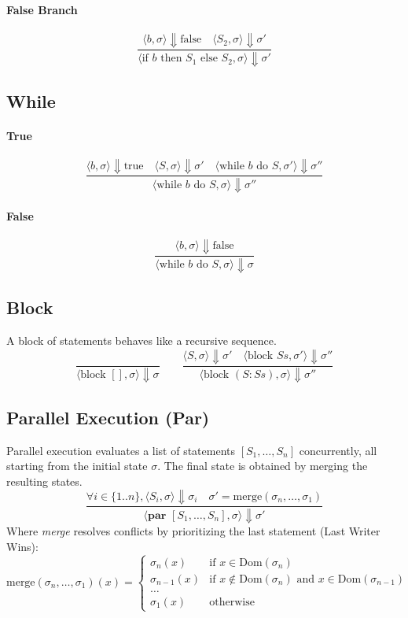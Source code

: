 \documentclass{article}
\begin{document}
	\paragraph{False Branch}
	\[
	\frac{\langle b, \sigma \rangle \Downarrow \text{false} \quad \langle S_2, \sigma \rangle \Downarrow \sigma'}{\langle \text{if } b \text{ then } S_1 \text{ else } S_2, \sigma \rangle \Downarrow \sigma'}
	\]
	
	\subsection{While}
	\paragraph{True}
	\[
	\frac{\langle b, \sigma \rangle \Downarrow \text{true} \quad \langle S, \sigma \rangle \Downarrow \sigma' \quad \langle \text{while }b \text{ do } S, \sigma' \rangle \Downarrow \sigma''}
	{\langle \text{while } b \text{ do } S, \sigma \rangle \Downarrow \sigma''}
	\]
	\paragraph{False}
	\[
	\frac{\langle b, \sigma \rangle \Downarrow \text{false}}
	{\langle \text{while } b \text { do } S, \sigma \rangle \Downarrow \sigma}
	\]
	
	\subsection{Block}
	A block of statements behaves like a recursive sequence.
	\[
	\frac{}{\langle \text{block } [], \sigma \rangle \Downarrow \sigma}
	\qquad
	\frac{\langle S, \sigma \rangle \Downarrow \sigma' \quad \langle \text{block } Ss, \sigma' \rangle \Downarrow \sigma''}{\langle \text{block } (S:Ss), \sigma \rangle \Downarrow \sigma''}
	\]
	
	\subsection{Parallel Execution (Par)}
	Parallel execution evaluates a list of statements $[S_1, \dots, S_n]$ concurrently, all starting from the initial state $\sigma$. The final state is obtained by merging the resulting states.
	\[
	\frac{\forall i \in \{1..n\}, \langle S_i, \sigma \rangle \Downarrow \sigma_i \quad \sigma' = \text{merge}(\sigma_n, \dots, \sigma_1)}{\langle \textbf{par } [S_1, \dots, S_n], \sigma \rangle \Downarrow \sigma'}
	\]
	Where \textit{merge} resolves conflicts by prioritizing the last statement (Last Writer Wins):
	\[
	\text{merge}(\sigma_n, \dots, \sigma_1)(x) = 
	\begin{cases} 
		\sigma_n(x) & \text{if } x \in \text{Dom}(\sigma_n) \\
		\sigma_{n-1}(x) & \text{if } x \notin \text{Dom}(\sigma_n) \text{ and } x \in \text{Dom}(\sigma_{n-1}) \\
		\dots \\
		\sigma_1(x) & \text{otherwise}
	\end{cases}
	\]
	
\end{document}
